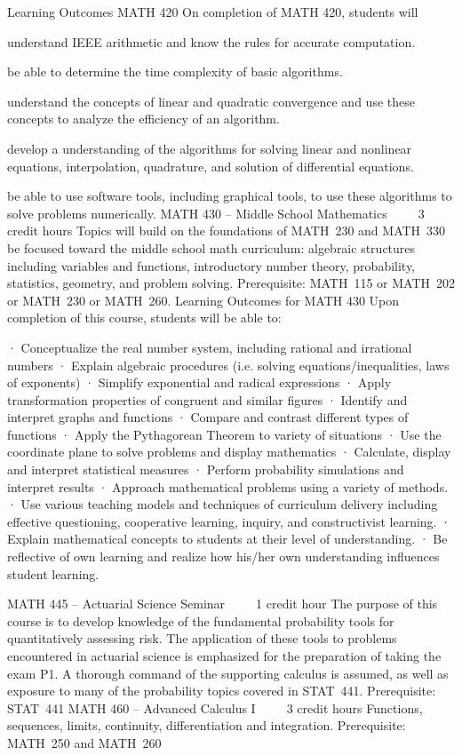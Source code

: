 Learning Outcomes MATH 420
On completion of MATH 420, students will
    \item understand IEEE arithmetic and know the rules for accurate computation.
    \item be able to determine the time complexity of basic algorithms.
    \item understand the concepts of linear and quadratic convergence and use these concepts to analyze the efficiency of an algorithm.
    \item develop a understanding of the algorithms for solving linear and nonlinear equations, interpolation, quadrature, and solution of differential equations.
    \item be able to use software tools, including graphical tools, to use these algorithms to solve problems numerically.
MATH 430 – Middle School Mathematics     3 credit hours
Topics will build on the foundations of MATH 230 and MATH 330 be focused toward the middle school math curriculum: algebraic structures including variables and functions, introductory number theory, probability, statistics, geometry, and problem solving.
Prerequisite: MATH 115 or MATH 202 or MATH 230 or MATH 260.
Learning Outcomes for MATH 430
Upon completion of this course, students will be able to: 

· Conceptualize the real number system, including rational and irrational numbers 
· Explain algebraic procedures (i.e. solving equations/inequalities, laws of exponents) 
· Simplify exponential and radical expressions 
· Apply transformation properties of congruent and similar figures 
· Identify and interpret graphs and functions 
· Compare and contrast different types of functions 
· Apply the Pythagorean Theorem to variety of situations 
· Use the coordinate plane to solve problems and display mathematics 
· Calculate, display and interpret statistical measures 
· Perform probability simulations and interpret results 
· Approach mathematical problems using a variety of methods. 
· Use various teaching models and techniques of curriculum delivery including effective questioning, cooperative learning, inquiry, and constructivist learning. 
· Explain mathematical concepts to students at their level of understanding. 
· Be reflective of own learning and realize how his/her own understanding influences student learning.

MATH 445 – Actuarial Science Seminar     1 credit hour
The purpose of this course is to develop knowledge of the fundamental probability tools for quantitatively assessing risk. The application of these tools to problems encountered in actuarial science is emphasized for the preparation of taking the exam P1. A thorough command of the supporting calculus is assumed, as well as exposure to many of the probability topics covered in STAT 441.
Prerequisite: STAT 441
MATH 460 – Advanced Calculus I     3 credit hours
Functions, sequences, limits, continuity, differentiation and integration.
Prerequisite: MATH 250 and MATH 260

